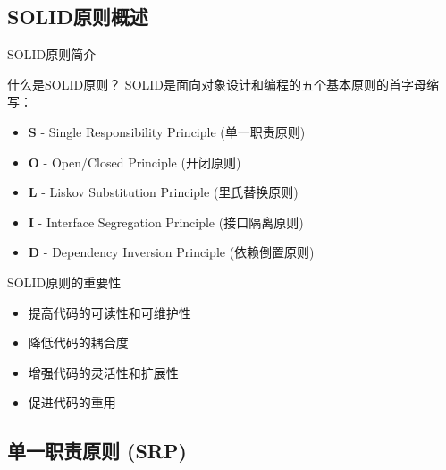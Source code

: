 \documentclass[UTF8,aspectratio=169]{beamer}
\begin{document}
\subsection{SOLID原则概述}

\begin{frame}{SOLID原则简介}
    \begin{ytublock}{什么是SOLID原则？}
        SOLID是面向对象设计和编程的五个基本原则的首字母缩写：
        \begin{itemize}
            \item \textbf{S} - Single Responsibility Principle (单一职责原则)
            \item \textbf{O} - Open/Closed Principle (开闭原则)
            \item \textbf{L} - Liskov Substitution Principle (里氏替换原则)
            \item \textbf{I} - Interface Segregation Principle (接口隔离原则)
            \item \textbf{D} - Dependency Inversion Principle (依赖倒置原则)
        \end{itemize}
    \end{ytublock}

    \begin{alertytublock}{SOLID原则的重要性}
        \begin{itemize}
            \item 提高代码的可读性和可维护性
            \item 降低代码的耦合度
            \item 增强代码的灵活性和扩展性
            \item 促进代码的重用
        \end{itemize}
    \end{alertytublock}
\end{frame}

\subsection{单一职责原则 (SRP)}
\end{document}
